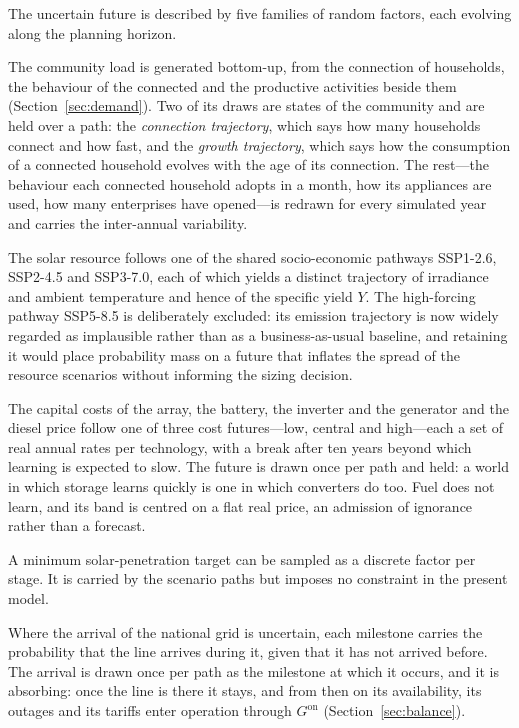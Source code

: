 \documentclass[11pt,a4paper]{article}
\theoremstyle{plain}
\theoremstyle{definition}
\begin{document}
The uncertain future is described by five families of random factors, each evolving along
the planning horizon.
\begin{description}[leftmargin=2.4cm,style=nextline]
  \item[Demand] The community load is generated bottom-up, from the connection of
  households, the behaviour of the connected and the productive activities beside them
  (Section~\ref{sec:demand}). Two of its draws are states of the community and are held
  over a path: the \emph{connection trajectory}, which says how many households connect
  and how fast, and the \emph{growth trajectory}, which says how the consumption of a
  connected household evolves with the age of its connection. The rest---the behaviour each
  connected household adopts in a month, how its appliances are used, how many enterprises
  have opened---is redrawn for every simulated year and carries the inter-annual
  variability.
  \item[Renewable resource] The solar resource follows one of the shared
  socio-economic pathways SSP1-2.6, SSP2-4.5 and SSP3-7.0, each of which yields
  a distinct trajectory of irradiance and ambient temperature and hence of the specific
  yield $Y$. The high-forcing pathway SSP5-8.5 is deliberately excluded: its emission
  trajectory is now widely regarded as implausible rather than as a business-as-usual
  baseline, and retaining it would place probability mass on a future that inflates the
  spread of the resource scenarios without informing the sizing decision.
  \item[Economic conditions] The capital costs of the array, the battery, the inverter and
  the generator and the diesel price follow one of three cost futures---low, central and
  high---each a set of real annual rates per technology, with a break after ten years
  beyond which learning is expected to slow. The future is drawn once per path and held: a
  world in which storage learns quickly is one in which converters do too. Fuel does not
  learn, and its band is centred on a flat real price, an admission of ignorance rather
  than a forecast.
  \item[Policy] A minimum solar-penetration target can be sampled as a discrete factor per
  stage. It is carried by the scenario paths but imposes no constraint in the present
  model.
  \item[National grid] Where the arrival of the national grid is uncertain, each milestone
  carries the probability that the line arrives during it, given that it has not arrived
  before. The arrival is drawn once per path as the milestone at which it occurs, and it is
  absorbing: once the line is there it stays, and from then on its availability, its
  outages and its tariffs enter operation through $G^{\mathrm{on}}$
  (Section~\ref{sec:balance}).
\end{description}
\end{document}
